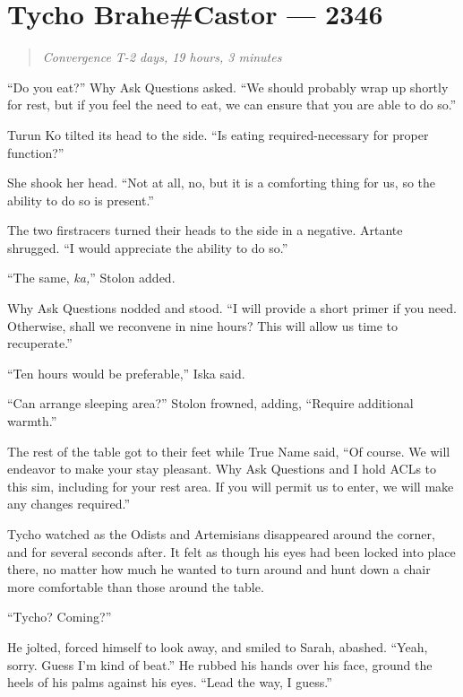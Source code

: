 \hypertarget{tycho-brahecastor-2346}{%
\chapter{Tycho Brahe\#Castor — 2346}\label{tycho-brahecastor-2346}}

\begin{quote}
\emph{Convergence T-2 days, 19 hours, 3 minutes}
\end{quote}

``Do you eat?'' Why Ask Questions asked. ``We should probably wrap up shortly for rest, but if you feel the need to eat, we can ensure that you are able to do so.''

Turun Ko tilted its head to the side. ``Is eating required-necessary for proper function?''

She shook her head. ``Not at all, no, but it is a comforting thing for us, so the ability to do so is present.''

The two firstracers turned their heads to the side in a negative. Artante shrugged. ``I would appreciate the ability to do so.''

``The same, \emph{ka,}'' Stolon added.

Why Ask Questions nodded and stood. ``I will provide a short primer if you need. Otherwise, shall we reconvene in nine hours? This will allow us time to recuperate.''

``Ten hours would be preferable,'' Iska said.

``Can arrange sleeping area?'' Stolon frowned, adding, ``Require additional warmth.''

The rest of the table got to their feet while True Name said, ``Of course. We will endeavor to make your stay pleasant. Why Ask Questions and I hold ACLs to this sim, including for your rest area. If you will permit us to enter, we will make any changes required.''

Tycho watched as the Odists and Artemisians disappeared around the corner, and for several seconds after. It felt as though his eyes had been locked into place there, no matter how much he wanted to turn around and hunt down a chair more comfortable than those around the table.

``Tycho? Coming?''

He jolted, forced himself to look away, and smiled to Sarah, abashed. ``Yeah, sorry. Guess I'm kind of beat.'' He rubbed his hands over his face, ground the heels of his palms against his eyes. ``Lead the way, I guess.''


